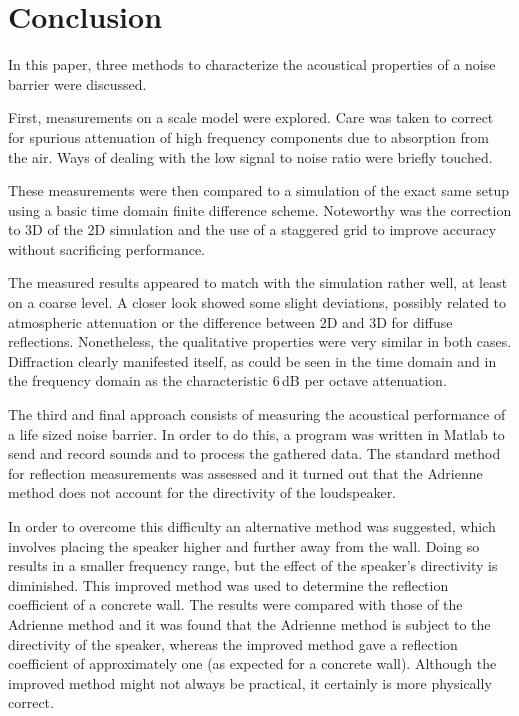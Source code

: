 \section{Conclusion}
In this paper, three methods to characterize the acoustical properties of a noise barrier were discussed. 

First, measurements on a scale model were explored. Care was taken to correct for spurious attenuation of high frequency components due to absorption from the air. Ways of dealing with the low signal to noise ratio were briefly touched.

These measurements were then compared to a simulation of the exact same setup using a basic time domain finite difference scheme. Noteworthy was the correction to 3D of the 2D simulation and the use of a staggered grid to improve accuracy without sacrificing performance.

The measured results appeared to match with the simulation rather well, at least on a coarse level. A closer look showed some slight deviations, possibly related to atmospheric attenuation or the difference between 2D and 3D for diffuse reflections. Nonetheless, the qualitative properties were very similar in both cases. Diffraction clearly manifested itself, as could be seen in the time domain and in the frequency domain as the characteristic 6\,dB per octave attenuation.

The third and final approach consists of measuring the acoustical performance of a life sized noise barrier. In order to do this, a program was written in Matlab to send and record sounds and to process the gathered data. The standard method for reflection measurements was assessed and it turned out that the Adrienne method does not account for the directivity of the loudspeaker.

In order to overcome this difficulty an alternative method was suggested, which involves placing the speaker higher and further away from the wall. Doing so results in a smaller frequency range, but the effect of the speaker's directivity is diminished. This improved method was used to determine the reflection coefficient of a concrete wall. The results were compared with those of the Adrienne method and it was found that the Adrienne method is subject to the directivity of the speaker, whereas the improved method gave a reflection coefficient of approximately one (as expected for a concrete wall). Although the improved method might not always be practical, it certainly is more physically correct.



